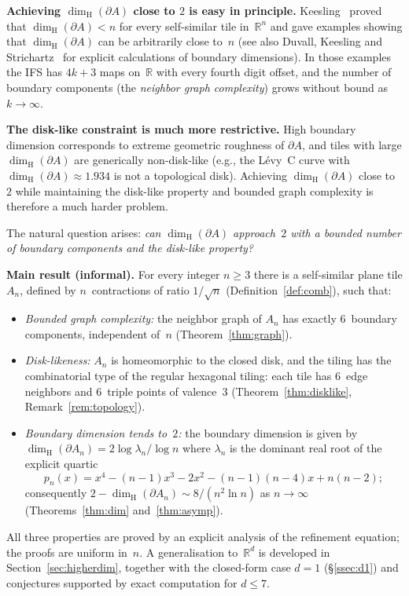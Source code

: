 \documentclass{amsart}
\theoremstyle{definition}
\theoremstyle{remark}
\newcommand{\R}{\mathbb{R}}
\newcommand{\dH}{\dim_{\mathrm{H}}}
\begin{document}
\textbf{Achieving $\dH(\partial A)$ close to $2$ is easy in principle.}
Keesling~\cite{keesling} proved that $\dH(\partial A) < n$ for every
self-similar tile in~$\R^n$ and gave examples showing that $\dH(\partial A)$
can be arbitrarily close to~$n$
(see also Duvall, Keesling and Strichartz~\cite{duvall-keesling-strichartz}
for explicit calculations of boundary dimensions).  In those examples the IFS has $4k{+}3$
maps on~$\R$ with every fourth digit offset, and the number of boundary
components (the \emph{neighbor graph complexity}) grows without bound
as $k \to \infty$.

\textbf{The disk-like constraint is much more restrictive.}
High boundary dimension corresponds to extreme geometric roughness of
$\partial A$, and tiles with large $\dH(\partial A)$ are generically
non-disk-like (e.g., the L{\'e}vy~C curve with
$\dH(\partial A) \approx 1.934$ is not a topological disk).
Achieving $\dH(\partial A)$ close to~$2$ while maintaining the
disk-like property and bounded graph complexity is therefore a much
harder problem.

The natural question arises: \emph{can $\dH(\partial A)$ approach~$2$
with a bounded number of boundary components and the disk-like property?}

\textbf{Main result (informal).}
For every integer $n \ge 3$ there is a self-similar plane tile $A_n$,
defined by $n$~contractions of ratio $1/\!\sqrt{n}$
(Definition~\ref{def:comb}), such that:
\begin{itemize}
\item[(a)] \emph{Bounded graph complexity:} the neighbor graph of $A_n$
  has exactly $6$~boundary components, independent of~$n$
  (Theorem~\ref{thm:graph}).
\item[(b)] \emph{Disk-likeness:} $A_n$ is homeomorphic to the closed
  disk, and the tiling has the combinatorial type of the regular
  hexagonal tiling: each tile has $6$~edge neighbors and $6$~triple
  points of valence~$3$ (Theorem~\ref{thm:disklike},
  Remark~\ref{rem:topology}).
\item[(c)] \emph{Boundary dimension tends to~$2$:} the boundary
  dimension is given by $\dH(\partial A_n) = 2\log\lambda_n / \log n$
  where $\lambda_n$ is the dominant real root of the explicit quartic
  \[
    p_n(x) = x^4 - (n{-}1)x^3 - 2x^2 - (n{-}1)(n{-}4)x + n(n{-}2);
  \]
  consequently $2 - \dH(\partial A_n) \sim 8/(n^2\ln n)$
  as $n\to\infty$ (Theorems~\ref{thm:dim} and~\ref{thm:asymp}).
\end{itemize}
All three properties are proved by an explicit analysis of the
refinement equation; the proofs are uniform in~$n$.  A generalisation
to~$\R^d$ is developed in Section~\ref{sec:higherdim}, together with
the closed-form case $d = 1$ (\S\ref{ssec:d1}) and conjectures
supported by exact computation for $d \le 7$.
\end{document}
